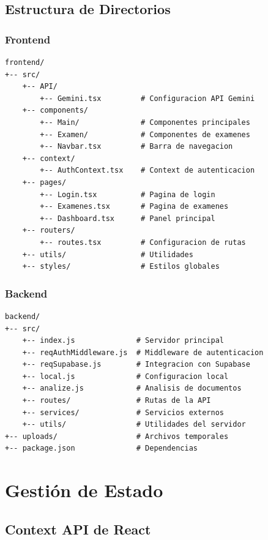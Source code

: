\documentclass[12pt,a4paper]{report}
\begin{document}
\subsection{Estructura de Directorios}

\subsubsection{Frontend}
\begin{lstlisting}
frontend/
+-- src/
    +-- API/
        +-- Gemini.tsx         # Configuracion API Gemini
    +-- components/
        +-- Main/              # Componentes principales
        +-- Examen/            # Componentes de examenes
        +-- Navbar.tsx         # Barra de navegacion
    +-- context/
        +-- AuthContext.tsx    # Context de autenticacion
    +-- pages/
        +-- Login.tsx          # Pagina de login
        +-- Examenes.tsx       # Pagina de examenes
        +-- Dashboard.tsx      # Panel principal
    +-- routers/
        +-- routes.tsx         # Configuracion de rutas
    +-- utils/                 # Utilidades
    +-- styles/                # Estilos globales
\end{lstlisting}

\subsubsection{Backend}
\begin{lstlisting}
backend/
+-- src/
    +-- index.js              # Servidor principal
    +-- reqAuthMiddleware.js  # Middleware de autenticacion
    +-- reqSupabase.js        # Integracion con Supabase
    +-- local.js              # Configuracion local
    +-- analize.js            # Analisis de documentos
    +-- routes/               # Rutas de la API
    +-- services/             # Servicios externos
    +-- utils/                # Utilidades del servidor
+-- uploads/                  # Archivos temporales
+-- package.json              # Dependencias
\end{lstlisting}

\section{Gestión de Estado}

\subsection{Context API de React}
\end{document}
